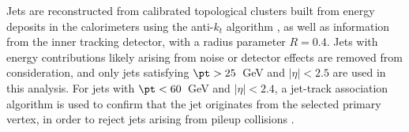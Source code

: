 

Jets are reconstructed from calibrated topological clusters built from energy deposits in the calorimeters using the anti-$k_t$ algorithm \cite{Cacciari_2008}, as well as information from the inner tracking detector, with a radius parameter $R=0.4$. Jets with energy contributions likely arising from noise or detector effects are removed from consideration, and only jets satisfying $\pt > 25$~GeV and $|\eta| < 2.5$ are used in this analysis.  For jets with $\pt < 60$~GeV and $|\eta| < 2.4$, a jet-track association algorithm is used to confirm that the jet originates from the selected primary vertex, in order to reject jets arising from pileup collisions \cite{PERF-2014-03}.


